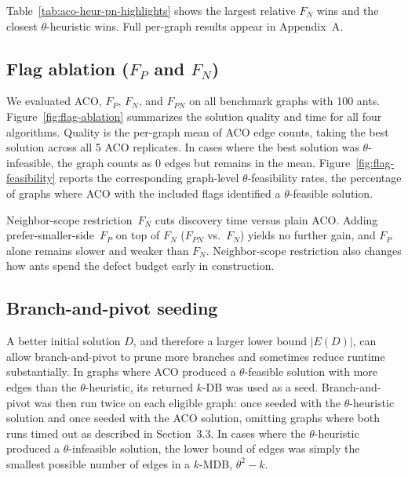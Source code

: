 \documentclass[conference]{IEEEtran}
\begin{document}
Table~\ref{tab:aco-heur-pn-highlights} shows the largest relative $F_N$ wins and the closest $\theta$-heuristic wins. Full per-graph results appear in Appendix~A.




\FloatBarrier
\subsection{Flag ablation ($F_P$ and $F_N$)}


We evaluated ACO, $F_P$, $F_N$, and $F_{PN}$ on all benchmark graphs with 100 ants. Figure~\ref{fig:flag-ablation} summarizes the solution quality and time for all four algorithms. Quality is the per-graph mean of ACO edge counts, taking the best solution across all 5 ACO replicates. In cases where the best solution was $\theta$-infeasible, the graph counts as 0 edges but remains in the mean. Figure~\ref{fig:flag-feasibility} reports the corresponding graph-level $\theta$-feasibility rates, the percentage of graphs where ACO with the  included flags identified a $\theta$-feasible solution.


Neighbor-scope restriction~$F_N$ cuts discovery time versus plain ACO. Adding prefer-smaller-side~$F_P$ on top of $F_N$ ($F_{PN}$ vs.\ $F_N$) yields no further gain, and $F_P$ alone remains slower and weaker than $F_N$.  Neighbor-scope restriction also changes how ants spend the defect budget early in construction. %






\FloatBarrier
\subsection{Branch-and-pivot seeding}


A better initial solution $D$, and therefore a larger lower bound $|E(D)|$, can allow branch-and-pivot to prune more branches and sometimes reduce runtime substantially. In graphs where ACO produced a $\theta$-feasible solution with more edges than the $\theta$-heuristic, its returned $k$-DB was used as a seed. Branch-and-pivot was then run twice on each eligible graph: once seeded with the $\theta$-heuristic solution and once seeded with the ACO solution, omitting graphs where both runs timed out as described in Section~3.3. In cases where the $\theta$-heuristic produced a $\theta$-infeasible solution, the lower bound of edges was simply the smallest possible number of edges in a $k$-MDB, $\theta^2 - k$.
\end{document}

